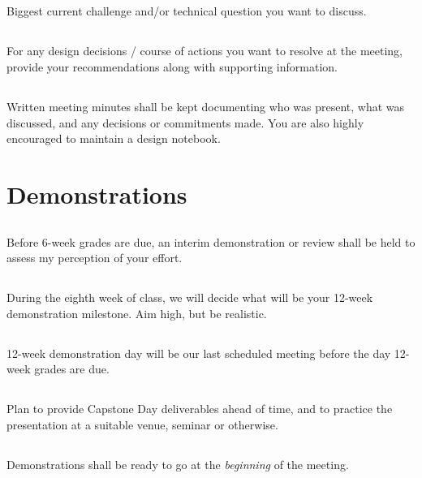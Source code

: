 \documentclass[10pt,courier]{navymemo}
\begin{document}
\subsection{} Biggest current challenge and/or technical question you want to discuss.
\subsection{} For any design decisions / course of actions you want to resolve at the meeting, provide your recommendations along with supporting information.
\subsection{} Written meeting minutes shall be kept documenting who was present, what was discussed, and any decisions or commitments made.  You are also highly encouraged to maintain a design notebook. 

\section{Demonstrations} 
\subsection{} Before 6-week grades are due, an interim demonstration or review shall be held to assess my perception of your effort.
\subsection{} During the eighth week of class, we will decide what will be your 12-week demonstration milestone. Aim high, but be realistic.
\subsection{} 12-week demonstration day will be our last scheduled meeting before the day 12-week grades are due.
\subsection{} Plan to provide Capstone Day deliverables ahead of time, and to practice the presentation at a suitable venue, seminar or otherwise. 
\subsection{} Demonstrations shall be ready to go at the \emph{beginning} of the meeting.
\end{document}
